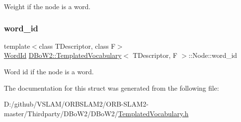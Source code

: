 Weight if the node is a word. 

\mbox{\label{struct_d_bo_w2_1_1_templated_vocabulary_1_1_node_aa56418d848932be4583fac6b3021c708}} 
\subsubsection{\texorpdfstring{word\+\_\+id}{word\_id}}
{\footnotesize\ttfamily template$<$class T\+Descriptor, class F$>$ \\
\mbox{\hyperlink{namespace_d_bo_w2_ab1a0d3283b2d4690a383372ed20bfeb5}{Word\+Id}} \mbox{\hyperlink{class_d_bo_w2_1_1_templated_vocabulary}{D\+Bo\+W2\+::\+Templated\+Vocabulary}}$<$ T\+Descriptor, F $>$\+::Node\+::word\+\_\+id}



Word id if the node is a word. 



The documentation for this struct was generated from the following file\+:\begin{DoxyCompactItemize}
\item 
D\+:/github/\+V\+S\+L\+A\+M/\+O\+R\+B\+S\+L\+A\+M2/\+O\+R\+B-\/\+S\+L\+A\+M2-\/master/\+Thirdparty/\+D\+Bo\+W2/\+D\+Bo\+W2/\mbox{\hyperlink{_templated_vocabulary_8h}{Templated\+Vocabulary.\+h}}\end{DoxyCompactItemize}
